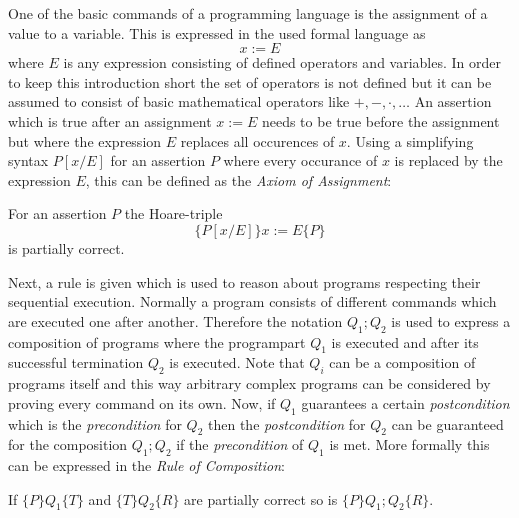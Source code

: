 	One of the basic commands of a programming language is the assignment
	of a value to a variable. This is expressed in the used formal language as
	$$x:=E$$
	where $E$ is any expression consisting of defined operators and variables.
	In order to keep this introduction short the set of operators is not defined
	but it can be assumed to consist of basic mathematical operators like
	$+,-,\cdot,\dots$
	An assertion which is true after an assignment $x:=E$ needs to be true before
	the assignment but where the expression $E$ replaces all occurences of $x$.
	Using a simplifying syntax $P[x/E]$ for an assertion $P$ where every occurance
	of $x$ is replaced by the expression $E$, this can be defined as the \emph{Axiom of Assignment}:
	\begin{mydef}
		For an assertion $P$ the Hoare-triple
			$$\{P[x/E]\} x:=E \{P\}$$
		is partially correct.
	\end{mydef}

	Next, a rule is given which is used to reason about programs respecting
	their sequential execution. Normally a program
	consists of different commands which are executed one after another. Therefore
	the notation $Q_1;Q_2$ is used to express a composition of programs where
	the programpart $Q_1$ is executed and after its successful termination $Q_2$ is
	executed.
	Note that $Q_i$ can be a composition of programs itself and this way
	arbitrary complex programs can be considered by proving every command on its
	own. Now, if $Q_1$
	guarantees a certain \emph{postcondition} which is
	the \emph{precondition} for $Q_2$ then the \emph{postcondition} for $Q_2$ can
	be guaranteed for the composition $Q_1;Q_2$ if the \emph{precondition} of $Q_1$
	is met. More formally this can be expressed in the \emph{Rule of Composition}:
	\begin{mydef}
		If $\{P\}Q_1\{T\}$ and $\{T\}Q_2\{R\}$ are partially correct so is
		   $\{P\}Q_1;Q_2\{R\}$.
	\end{mydef}

